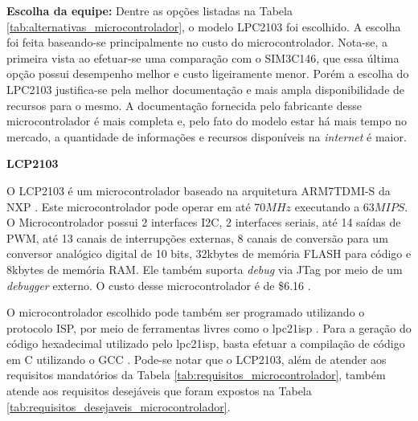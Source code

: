 \textbf{Escolha da equipe:} Dentre as opções listadas na Tabela \ref{tab:alternativas_microcontrolador}, o modelo LPC2103 foi escolhido. A escolha foi feita baseando-se principalmente no custo do microcontrolador. Nota-se, a primeira vista ao efetuar-se uma comparação com o SIM3C146, que essa última opção possui desempenho melhor e custo ligeiramente menor. Porém a escolha do LPC2103 justifica-se pela melhor documentação e mais ampla disponibilidade de recursos para o mesmo. A documentação fornecida pelo fabricante desse microcontrolador é mais completa e, pelo fato do modelo estar há mais tempo no mercado, a quantidade de informações e recursos disponíveis na \textit{internet} é maior.

\textbf{LCP2103}

O LCP2103 é um microcontrolador baseado na arquitetura ARM7TDMI-S da NXP \cite{lpc2103}. Este microcontrolador pode operar em até $ 70MHz $ executando a $ 63MIPS $. O Microcontrolador possui 2 interfaces I2C, 2 interfaces seriais, até 14 saídas de PWM, até 13 canais de interrupções externas, 8 canais de conversão para um conversor analógico digital de 10 bits, 32kbytes de memória FLASH para código e 8kbytes de memória RAM. Ele também suporta \textit{debug} via JTag por meio de um \textit{debugger} externo. O custo desse microcontrolador é de \$6.16 \cite{digikey}.

O microcontrolador escolhido pode também ser programado utilizando o protocolo ISP, por meio de ferramentas livres como o lpc21isp \cite{lpc21isp}. Para a geração do código hexadecimal utilizado pelo lpc21isp, basta efetuar a compilação de código em C utilizando o GCC \cite{gcc}.
Pode-se notar que o LCP2103, além de atender aos requisitos mandatórios da Tabela \ref{tab:requisitos_microcontrolador}, também atende aos requisitos desejáveis que foram expostos na Tabela \ref{tab:requisitos_desejaveis_microcontrolador}.
